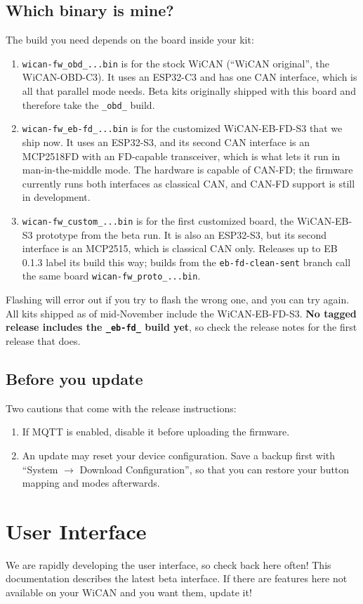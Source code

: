 \documentclass[superscriptaddress,onecolumn,floatfix]{revtex4-2}
\begin{document}
\subsection{Which binary is mine?}
The build you need depends on the board inside your kit:
\begin{enumerate}
  \item \texttt{wican-fw\_obd\_...bin} is for the stock WiCAN (``WiCAN original'', the WiCAN-OBD-C3). It uses an ESP32-C3 and has one CAN interface, which is all that parallel mode needs. Beta kits originally shipped with this board and therefore take the \texttt{\_obd\_} build.
  \item \texttt{wican-fw\_eb-fd\_...bin} is for the customized WiCAN-EB-FD-S3 that we ship now. It uses an ESP32-S3, and its second CAN interface is an MCP2518FD with an FD-capable transceiver, which is what lets it run in man-in-the-middle mode. The hardware is capable of CAN-FD; the firmware currently runs both interfaces as classical CAN, and CAN-FD support is still in development.
  \item \texttt{wican-fw\_custom\_...bin} is for the first customized board, the WiCAN-EB-S3 prototype from the beta run. It is also an ESP32-S3, but its second interface is an MCP2515, which is classical CAN only. Releases up to EB 0.1.3 label its build this way; builds from the \texttt{eb-fd-clean-sent} branch call the same board \texttt{wican-fw\_proto\_...bin}.
\end{enumerate}
Flashing will error out if you try to flash the wrong one, and you can try again. All kits shipped as of mid-November include the WiCAN-EB-FD-S3. \textbf{No tagged release includes the \texttt{\_eb-fd\_} build yet}, so check the release notes for the first release that does.

\subsection{Before you update}
Two cautions that come with the release instructions:
\begin{enumerate}
  \item If MQTT is enabled, disable it before uploading the firmware.
  \item An update may reset your device configuration. Save a backup first with ``System $\to$ Download Configuration'', so that you can restore your button mapping and modes afterwards.
\end{enumerate}

\section{User Interface}
We are rapidly developing the user interface, so check back here often! This documentation describes the latest beta interface. If there are features here not available on your WiCAN and you want them, update it!
\end{document}
